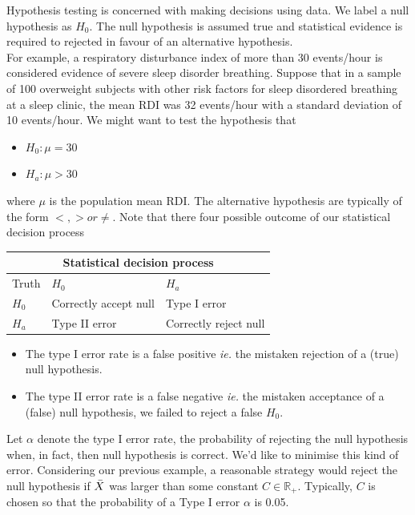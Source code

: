 \documentclass{homework}
\begin{document}
Hypothesis testing is concerned with making decisions using data. We label a null hypothesis as $H_0$. The null hypothesis is assumed true and statistical evidence is required to rejected in favour of an alternative hypothesis. \\

For example, a respiratory disturbance index of more than 30 events/hour is considered evidence of severe sleep disorder breathing. Suppose that in a sample of 100 overweight subjects with other risk factors for sleep disordered breathing at a sleep clinic, the mean RDI was 32 events/hour with a standard deviation of 10 events/hour. We might want to test the hypothesis that 

\begin{itemize}
    \item $H_0 : \mu = 30$ 
    \item $H_a : \mu > 30$ 
\end{itemize}

where $\mu$ is the population mean RDI. The alternative hypothesis are typically of the form $<,> or \neq$. Note that there four possible outcome of our statistical decision process\\

\begin{center}
\begin{tabular}{ |p{1cm}||p{5cm}|p{5cm}|  }
 \hline
 \multicolumn{3}{|c|}{Statistical decision process} \\
 \hline
 Truth& $H_0$ & $H_a$\\
 \hline
 $H_0$  & Correctly accept null & Type I error\\
 $H_a$ &  Type II error & Correctly reject null\\
 \hline
\end{tabular}
\end{center}

\begin{itemize}
    \item The type I error rate is a false positive \textit{ie.} the mistaken rejection of a (true) null hypothesis. 
    \item The type II error rate is a false negative \textit{ie.} the mistaken acceptance of a (false) null hypothesis, we failed to reject a false $H_0$.
\end{itemize}

Let $\alpha$ denote the type I error rate, the probability of rejecting the null hypothesis when, in fact, then null hypothesis is correct. We'd like to minimise this kind of error. Considering our previous example, a reasonable strategy would reject the null hypothesis if $\Bar{X}$ was larger than some constant $C \in \mathds{R}_{+}$. Typically, $C$ is chosen so that the probability of a Type I error $\alpha$ is 0.05. \\
\end{document}
